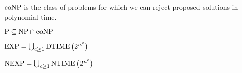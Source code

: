 \begin{note}
  $\mathrm{coNP}$ is the class of problems for which we can reject proposed solutions
  in polynomial time.
\end{note}

\begin{note}
  $\mathrm{P} \subseteq \mathrm{NP} \cap \mathrm{coNP}$
\end{note}

\begin{note}[$\EXP$]
  $\mathrm{EXP} = \bigcup_{c \geq 1} \mathrm{DTIME}\left(2^{n^c}\right)$
\end{note}

\begin{note}[$\NEXP$]
  $\mathrm{NEXP} = \bigcup_{c \geq 1} \mathrm{NTIME}\left(2^{n^c}\right)$
\end{note}
